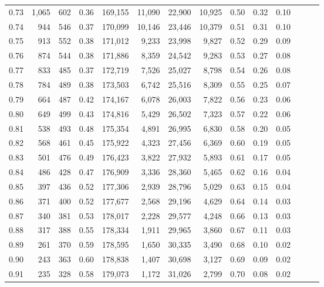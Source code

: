 \begin{tabular}{rrrrrrrrrrrrrr}
0.73 &  1,065 &  602 &  0.36 &  169,155 &   11,090 &  22,900 &  10,925 &  0.50 &  0.32 &      0.10 \\
0.74 &    944 &  546 &  0.37 &  170,099 &   10,146 &  23,446 &  10,379 &  0.51 &  0.31 &      0.10 \\
0.75 &    913 &  552 &  0.38 &  171,012 &    9,233 &  23,998 &   9,827 &  0.52 &  0.29 &      0.09 \\
0.76 &    874 &  544 &  0.38 &  171,886 &    8,359 &  24,542 &   9,283 &  0.53 &  0.27 &      0.08 \\
0.77 &    833 &  485 &  0.37 &  172,719 &    7,526 &  25,027 &   8,798 &  0.54 &  0.26 &      0.08 \\
0.78 &    784 &  489 &  0.38 &  173,503 &    6,742 &  25,516 &   8,309 &  0.55 &  0.25 &      0.07 \\
0.79 &    664 &  487 &  0.42 &  174,167 &    6,078 &  26,003 &   7,822 &  0.56 &  0.23 &      0.06 \\
0.80 &    649 &  499 &  0.43 &  174,816 &    5,429 &  26,502 &   7,323 &  0.57 &  0.22 &      0.06 \\
0.81 &    538 &  493 &  0.48 &  175,354 &    4,891 &  26,995 &   6,830 &  0.58 &  0.20 &      0.05 \\
0.82 &    568 &  461 &  0.45 &  175,922 &    4,323 &  27,456 &   6,369 &  0.60 &  0.19 &      0.05 \\
0.83 &    501 &  476 &  0.49 &  176,423 &    3,822 &  27,932 &   5,893 &  0.61 &  0.17 &      0.05 \\
0.84 &    486 &  428 &  0.47 &  176,909 &    3,336 &  28,360 &   5,465 &  0.62 &  0.16 &      0.04 \\
0.85 &    397 &  436 &  0.52 &  177,306 &    2,939 &  28,796 &   5,029 &  0.63 &  0.15 &      0.04 \\
0.86 &    371 &  400 &  0.52 &  177,677 &    2,568 &  29,196 &   4,629 &  0.64 &  0.14 &      0.03 \\
0.87 &    340 &  381 &  0.53 &  178,017 &    2,228 &  29,577 &   4,248 &  0.66 &  0.13 &      0.03 \\
0.88 &    317 &  388 &  0.55 &  178,334 &    1,911 &  29,965 &   3,860 &  0.67 &  0.11 &      0.03 \\
0.89 &    261 &  370 &  0.59 &  178,595 &    1,650 &  30,335 &   3,490 &  0.68 &  0.10 &      0.02 \\
0.90 &    243 &  363 &  0.60 &  178,838 &    1,407 &  30,698 &   3,127 &  0.69 &  0.09 &      0.02 \\
0.91 &    235 &  328 &  0.58 &  179,073 &    1,172 &  31,026 &   2,799 &  0.70 &  0.08 &      0.02 \\

\end{tabular}
